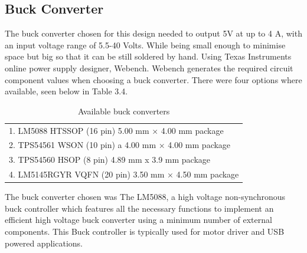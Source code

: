 \subsection{Buck Converter}
\vspace{-3mm}
The buck converter chosen for this design needed to output 5V at up to 4 A, with an input voltage range of 5.5-40 Volts. While being small enough to minimise space but big so that it can be still soldered by hand. Using Texas Instruments online power supply designer, Webench. Webench generates the required circuit component values when choosing a buck converter. There were four options where available, seen below in Table 3.4.
\begin{table}[H]
    \centering
    \begin{tabular}{|l|}
    \hline
        1. LM5088 HTSSOP (16 pin) 5.00 mm × 4.00 mm package\\
        2. TPS54561  WSON (10 pin) a 4.00 mm × 4.00 mm package\\
        3. TPS54560 HSOP (8 pin) 4.89 mm x 3.9 mm package\\
        4. LM5145RGYR VQFN (20 pin) 3.50 mm × 4.50 mm  package\\
        \hline
    \end{tabular}
    \caption{Available buck converters}
\end{table}
\vspace{-5mm}
The buck converter chosen was The LM5088, a high voltage non-synchronous buck controller which features all the necessary functions to implement an efficient high voltage buck converter using a minimum number of external components. This Buck controller is typically used for motor driver and USB powered applications. 
\vspace{-2mm}
